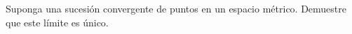 \documentclass[a4paper,10pt]{article}
\begin{document}

% 
\begin{qboxshort}
  Suponga una sucesión convergente de puntos en un espacio métrico.
  Demuestre que este límite es único.
\end{qboxshort}


\end{document}
